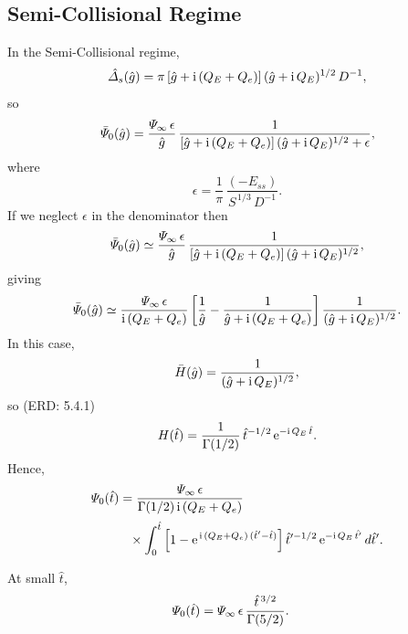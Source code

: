 \documentclass[titlepage=false,12pt]{article}
\begin{document}
\subsection{Semi-Collisional Regime}
In the Semi-Collisional regime, 
\begin{equation}
\hat{\mit\Delta}_s(\hat{g}) = \pi\,[\hat{g}+ {\rm i}\,(Q_E+Q_e)]\,(\hat{g}+{\rm i} \,Q_E)^{1/2}\,D^{-1},
\end{equation}
so 
\begin{equation}
\bar{\mit\Psi}_{0}(\hat{g}) =\frac{{\mit\Psi}_\infty\,\epsilon}{\hat{g}}\,\frac{1}{[\hat{g}+ {\rm i}\,(Q_E+Q_e)]\,(\hat{g}+{\rm i} \,Q_E)^{1/2}
+\epsilon},
\end{equation}
where
\begin{equation}
\epsilon= \frac{1}{\pi}\,\frac{(-E_{ss})}{S^{\,1/3}\,D^{-1}}.
\end{equation}
If we neglect $\epsilon$ in the denominator then
\begin{equation} 
\bar{\mit\Psi}_{0}(\hat{g}) \simeq \frac{{\mit\Psi}_\infty\,\epsilon}{\hat{g}}\,\frac{1}{[\hat{g}+ {\rm i}\,(Q_E+Q_e)]\,(\hat{g}+{\rm i} \,Q_E)^{1/2}},
\end{equation}
giving
\begin{equation}
\bar{\mit\Psi}_{0}(\hat{g}) \simeq \frac{{\mit\Psi}_\infty\,\epsilon}{{\rm i}\,(Q_E+Q_e)}
\left[\frac{1}{\hat{g}}- \frac{1}{\hat{g}+ {\rm i}\,(Q_E+Q_e)}\right]\frac{1}{(\hat{g}+{\rm i} \,Q_E)^{1/2}}.
\end{equation}
In this case, 
\begin{equation}
\bar{H}(\hat{g}) = \frac{1}{(\hat{g}+{\rm i}\,Q_E)^{1/2}},
\end{equation}
so (ERD: 5.4.1)
\begin{equation}
H(\hat{t}) = \frac{1}{\Gamma(1/2)}\,\hat{t}^{-1/2}\,{\rm e}^{-{\rm i}\,Q_E\,\hat{t}}.
\end{equation}
Hence,
\begin{align}
{\mit\Psi}_{0}(\hat{t}) &= \frac{{\mit\Psi}_\infty\,\epsilon}{\Gamma(1/2)\,{\rm i}\,(Q_E+Q_e)}\nonumber\\[0.5ex]
&\phantom{=}\times \int
_0^{\hat{t}}\left[1-{\rm e}^{\,{\rm i}\,(Q_E+Q_e)\,(\hat{t}'-\hat{t})}\right]
\hat{t}'^{-1/2}\,{\rm e}^{-{\rm i}\,Q_E\,\hat{t'}}\,d\hat{t}'.
\end{align}

At small $\hat{t}$, 
\begin{align}
{\mit\Psi}_{0}(\hat{t}) &= {\mit\Psi}_\infty\,\epsilon\,\frac{\hat{t}^{\,3/2}}{\Gamma(5/2)}.
\end{align}
\end{document}
